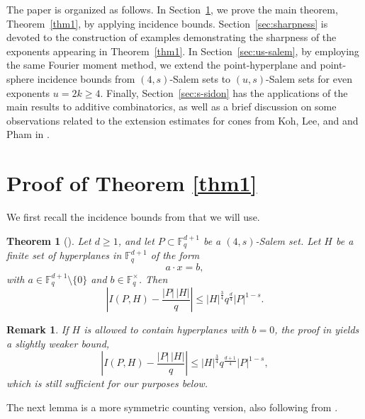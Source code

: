 \documentclass{article}
\newtheorem{theorem}{Theorem}[section]
\newtheorem{remark}{Remark}[section]
\begin{document}
The paper is organized as follows.
In Section~\ref{section2}, we prove the main theorem, Theorem~\ref{thm1}, by applying incidence bounds.
Section~\ref{sec:sharpness} is devoted to the construction of examples demonstrating the sharpness of the exponents appearing in Theorem~\ref{thm1}.
In Section~\ref{sec:us-salem}, by employing the same Fourier moment method, we extend the point-hyperplane and point-sphere incidence bounds from
$(4,s)$-Salem sets to $(u,s)$-Salem sets for even exponents $u=2k\ge 4$.
Finally, Section~\ref{sec:s-sidon} has the applications of the main results to additive combinatorics, as well as a brief discussion on some observations related to the extension estimates for cones from Koh, Lee, and and Pham in \cite{KLP22}.





\section{Proof of Theorem \ref{thm1}}\label{section2}

We first recall the incidence bounds from \cite{CGKPTZ25} that we will use.
\begin{theorem}[{\cite[Theorem 41]{CGKPTZ25}}]\label{nonzero}
Let $d \ge 1$, and let $P \subset \mathbb{F}_q^{d+1}$ be a $(4,s)$-Salem set. Let $H$ be a finite set of hyperplanes in $\mathbb{F}_q^{d+1}$ of the form
\[
{a} \cdot {x} = b,
\]
with ${a} \in \mathbb{F}_q^{d+1} \setminus \{0\}$ and $b \in \mathbb{F}_q^\times$. Then
\[
\left| I(P,H) - \frac{|P| \, |H|}{q} \right|
\le |H|^{\frac{3}{4}} q^{\frac{d}{4}} |P|^{1-s}.
\]
\end{theorem}

\begin{remark}
If $H$ is allowed to contain hyperplanes with $b=0$, the proof in \cite{CGKPTZ25} yields a slightly weaker bound,
\[
\left| I(P,H) - \frac{|P| \, |H|}{q} \right|
\le |H|^{\frac{3}{4}} q^{\frac{d+1}{4}} |P|^{1-s},
\]
which is still sufficient for our purposes below.
\end{remark}
The next lemma is a more symmetric counting version, also following from \cite{CGKPTZ25}.

\end{document}
